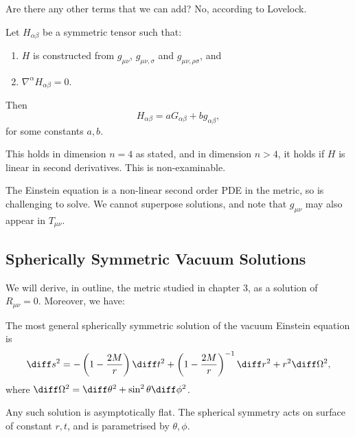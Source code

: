 \documentclass[12pt]{article}
\begin{document}
Are there any other terms that we can add? No, according to Lovelock.

\begin{theorem}
	Let $H_{\alpha\beta}$ be a symmetric tensor such that:
	\begin{enumerate}[\normalfont(i)]
		\item $H$ is constructed from $g_{\mu\nu}$, $g_{\mu\nu,\sigma}$ and $g_{\mu\nu,\rho\sigma}$, and
		\item $\nabla^\alpha H_{\alpha\beta} = 0$.
	\end{enumerate}
	Then
	\[
	H_{\alpha\beta} = a G_{\alpha\beta} + b g_{\alpha\beta},
	\]
	for some constants $a, b$.
\end{theorem}

This holds in dimension $n = 4$ as stated, and in dimension $n > 4$, it holds if $H$ is linear in second derivatives. This is non-examinable.

\begin{remark}
	The Einstein equation is a non-linear second order PDE in the metric, so is challenging to solve. We cannot superpose solutions, and note that $g_{\mu\nu}$ may also appear in $T_{\mu\nu}$.
\end{remark}

\subsection{Spherically Symmetric Vacuum Solutions}
\label{sub:ssvs}

We will derive, in outline, the metric studied in chapter $3$, as a solution of $R_{\mu\nu} = 0$. Moreover, we have:

\begin{theorem}
	The most general spherically symmetric solution of the vacuum Einstein equation is
	\[
	\diff s^2 = - \left( 1 - \frac{2M}{r} \right) \diff t^2 + \left( 1 - \frac{2M}{r} \right)^{-1} \diff r^2 + r^2 \diff \Omega^2,
	\]
	where $\diff \Omega^2 = \diff \theta^2 + \sin^2 \theta \diff \phi^2$.

	Any such solution is asymptotically flat. The spherical symmetry acts on surface of constant $r, t$, and is parametrised by $\theta, \phi$.
\end{theorem}
\end{document}
